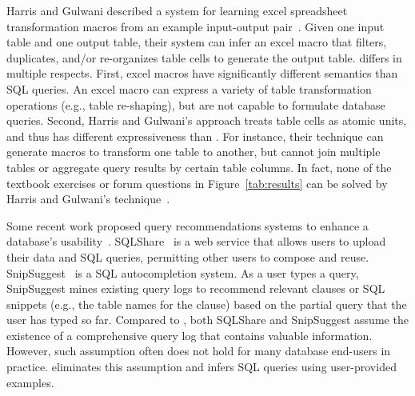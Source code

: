 


Harris and Gulwani described a system for learning excel
spreadsheet transformation macros from an example
input-output pair~\cite{Harris:2011}. Given one input table and one output
table, their system can infer an excel macro that filters,
duplicates, and/or re-organizes table cells to generate the output table.
\ourtool differs in multiple respects.
First, excel macros have significantly different
semantics than SQL queries.
An excel macro can express a variety of table transformation operations
(e.g., table re-shaping), but are not capable to formulate database queries.
Second, Harris and Gulwani's approach treats table cells
as atomic units, and thus has different expressiveness
than \ourtool. For instance, their technique can generate macros to
transform one table to another, but cannot join multiple
tables or aggregate query results by certain table columns. 
In fact, none of the textbook exercises or forum questions
in Figure~\ref{tab:results} can be solved by
Harris and Gulwani's technique~\cite{Harris:2011}.




Some recent work proposed query recommendations systems
to enhance a database's usability~\cite{Howe:2011, Khoussainova:2010}. 
SQLShare~\cite{Howe:2011} is a web service that allows
users to upload their data and SQL queries,
permitting other users
to compose and reuse. SnipSuggest~\cite{Khoussainova:2010} is a SQL autocompletion
system. As a user types a query, SnipSuggest mines existing query
logs to recommend relevant clauses or SQL snippets (e.g., the table
names for the  clause) based on the partial query that
the user has typed so far.
Compared to \ourtool, both SQLShare and SnipSuggest assume the
existence of a comprehensive query log
that contains valuable information.
However, such assumption often does not hold for
many database end-users in practice.
\ourtool eliminates this assumption and infers 
SQL queries using user-provided examples.


